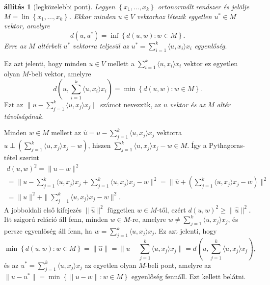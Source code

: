 \documentclass[9pt, a4paper, showtrims]{memoir}
\makeatletter
\renewenvironment{proof}[1][\proofname]
    {\par\pushQED{\qed}%
    \normalfont \topsep6\p@\@plus6\p@\relax
    \trivlist
    \item[\hskip\labelsep
        \itshape
    #1\@addpunct{:}]\ignorespaces}
    {\popQED\endtrivlist\@endpefalse}
\theoremstyle{plain}
\newtheorem{proposition}{állítás}[chapter]
\theoremstyle{remark}
\theoremstyle{definition}
\DeclareMathOperator{\lin}{lin}
\newcommand{\ip}[2]{\langle#1,#2\rangle}
\makeatother
\begin{document}
\begin{proposition}[legközelebbi pont]\label{pr:legkozelebb}
	Legyen $\left\{ x_1,\ldots,x_k \right\}$ ortonormált rendszer és
	jelölje $M=\lin\left\{ x_1,\ldots,x_k \right\}$.
	Ekkor minden $u\in V$ vektorhoz létezik egyetlen $u^\ast\in M$
	vektor, amelyre
	\[
		d\left( u,u^\ast\right)
		=
		\inf\left\{ d\left( u,w \right):w\in M \right\}.
	\]
	Erre az $M$ altérbeli $u^\ast$ vektorra teljesül az $u^\ast=\sum_{i=1}^k\ip{u}{x_i}x_i$ egyenlőség.
\end{proposition}
Ez azt jelenti,
hogy minden $u\in V$ mellett a
$\sum_{i=1}^k\ip{u}{x_i}x_i$
vektor ez egyetlen olyan $M$-beli vektor, amelyre
\[
	d\left( u,\sum_{i=1}^k\ip{u}{x_i}x_i \right)
	=
	\min\left\{ d\left( u,w \right):w\in M \right\}.
\]
Ezt az
\begin{math}
	\|u-\sum_{j=1}^k\ip{u}{x_j}x_j\|
\end{math}
számot nevezzük, az \emph{$u$ vektor és az $M$ altér távolságának.}
\begin{proof}
	Minden $w\in M$ mellett az $\hat{u}=u-\sum_{j=1}^k\ip{u}{x_j}x_j$ vektorra
	$\hat{u}\perp \left( \sum_{j=1}^k\ip{u}{x_j}x_j-w \right)$,
	hiszen $\sum_{j=1}^k\ip{u}{x_j}x_j-w\in M$.
	Így a Pythagoras-tétel szerint
	\begin{multline*}
		d\left( u,w \right)^2
		=
		\|u-w\|^2
		\\
		=
		\|u-\sum_{j=1}^k\ip{u}{x_j}x_j+\sum_{j=1}^k\ip{u}{x_j}x_j-w\|^2
		=
		\|\hat{u}+\left( \sum_{j=1}^k\ip{u}{x_j}x_j-w \right)\|^2
		\\
		=
		\|\hat{u}\|^2+\|\sum_{j=1}^k\ip{u}{x_j}x_j-w\|^2.
	\end{multline*}
	A jobboldali első kifejezés $\|\hat{u}\|^2$ független $w\in M$-től,
	ezért
	\begin{math}
		d\left( u,w \right)^2
		\geq
		\|\hat{u}\|^2.
	\end{math}
	Itt szigorú reláció áll fenn, minden $w\in M$-re, amelyre
	$w\neq\sum_{j=1}^k\ip{u}{x_j}x_j $,
	és persze egyenlőség áll fenn, ha
	$w=\sum_{j=1}^k\ip{u}{x_j}x_j $.
	Ez azt jelenti,
	hogy
	\[
		\min\left\{ d\left( u,w \right):w\in M \right\}
		=
		\|\hat{u}\|
		=
		\| u-\sum_{j=1}^k\ip{u}{x_j}x_j\|
		=
		d\left( u,\sum_{j=1}^k\ip{u}{x_j}x_j\right),
	\]
	és az $u^\ast=\sum_{j=1}^k\ip{u}{x_j}x_j $ az egyetlen olyan $M$-beli pont, amelyre
	az
	$\|u-u^\ast\|=\min\left\{ \|u-w\|:w\in M  \right\}$ egyenlőség fennáll.
	Ezt kellett belátni.
\end{proof}
\end{document}
